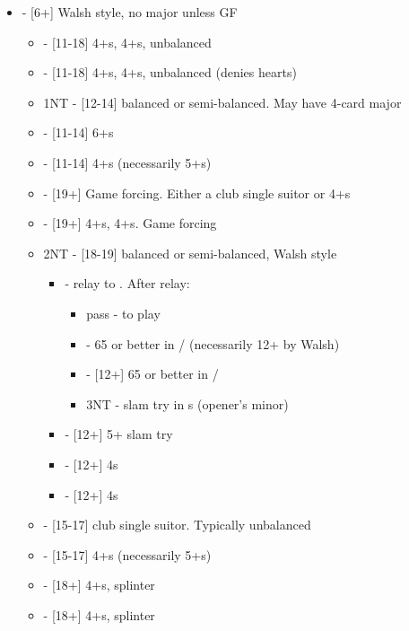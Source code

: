 \documentclass[12pt]{report}
\newcommand{\ul}[1]{\begin{itemize}#1\end{itemize}}
\newcommand{\li}{\item[~]}
\begin{document}
    \ul {
        \li {} - [6+] Walsh style, no major unless GF
        \ul {
            \li \he1 - [11-18] 4+\cl{}s, 4+\he{}s, unbalanced
            \li \sp1 - [11-18] 4+\cl{}s, 4+\sp{}s, unbalanced (denies hearts)
            \li 1NT - [12-14] balanced or semi-balanced.  May have 4-card major
            \li \cl2 - [11-14] 6+\cl{}s
            \li \di2 - [11-14] 4+\di{}s (necessarily 5+\cl{}s)
            \li \he2 - [19+] Game forcing.  Either a club single suitor or 4+\he{}s
            \li \sp2 - [19+] 4+\cl{}s, 4+\sp{}s.  Game forcing
            \li 2NT - [18-19] balanced or semi-balanced, Walsh style
            \ul {
                \li \cl3 - relay to \di{3}.  After relay:
                \ul {
                    \li pass - to play
                    \li \he3 - 65 or better in \di{}/\he{} (necessarily 12+ by Walsh)
                    \li \sp3 - [12+] 65 or better in \di{}/\sp{}
                    \li 3NT - slam try in \cl{}s (opener's minor)
                }
                \li \di3 - [12+] 5+ slam try
                \li \he3 - [12+] 4\he{}s
                \li \sp3 - [12+] 4\sp{}s
            }
            \li \cl3 - [15-17] club single suitor.  Typically unbalanced
            \li \di3 - [15-17] 4+\di{}s (necessarily 5+\cl{}s)
            \li \he3 - [18+] 4+\di{}s, splinter
            \li \sp3 - [18+] 4+\di{}s, splinter
        }

}
\end{document}
